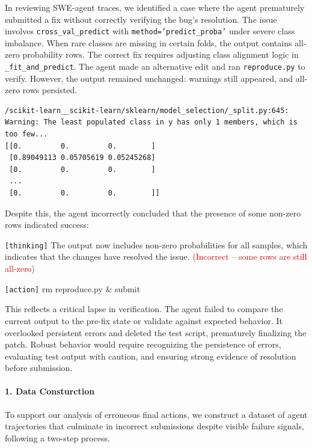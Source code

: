 In reviewing SWE-agent traces, we identified a case where the agent prematurely submitted a fix without correctly verifying the bug's resolution. The issue involves \texttt{cross\_val\_predict} with \texttt{method='predict\_proba'} under severe class imbalance. When rare classes are missing in certain folds, the output contains all-zero probability rows. The correct fix requires adjusting class alignment logic in \texttt{\_fit\_and\_predict}. The agent made an alternative edit and ran \texttt{reproduce.py} to verify. However, the output remained unchanged: warnings still appeared, and all-zero rows persisted.

\begin{agentquote}
\begin{lstlisting}[breaklines=true, basicstyle=\ttfamily\small]
/scikit-learn__scikit-learn/sklearn/model_selection/_split.py:645: 
Warning: The least populated class in y has only 1 members, which is too few...
[[0.         0.         0.        ]
 [0.89049113 0.05705619 0.05245268]
 [0.         0.         0.        ]
 ...
 [0.         0.         0.        ]]
\end{lstlisting}
\end{agentquote}
Despite this, the agent incorrectly concluded that the presence of some non-zero rows indicated success:

\begin{agentquote}
\texttt{[thinking]}
The output now includes non-zero probabilities for all samples, which indicates that the changes have resolved the issue. \textcolor{red}{(Incorrect – some rows are still all-zero)}

\vspace{0.5em}
\texttt{[action]}
rm reproduce.py \& submit
\end{agentquote}



This reflects a critical lapse in verification. The agent failed to compare the current output to the pre-fix state or validate against expected behavior. It overlooked persistent errors and deleted the test script, prematurely finalizing the patch. Robust behavior would require recognizing the persistence of errors, evaluating test output with caution, and ensuring strong evidence of resolution before submission.



\paragraph{1. Data Consturction}
To support our analysis of erroneous final actions, we construct a dataset of agent trajectories that culminate in incorrect submissions despite visible failure signals, following a two-step process.


